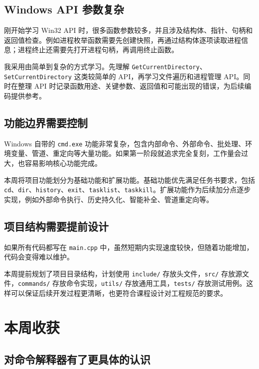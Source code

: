 \documentclass[UTF8]{ctexart}
\begin{document}
\subsection{Windows API 参数复杂}

刚开始学习 Win32 API 时，很多函数参数较多，并且涉及结构体、指针、句柄和返回值检查。例如进程枚举函数需要先创建快照，再通过结构体逐项读取进程信息；进程终止还需要先打开进程句柄，再调用终止函数。

我采用由简单到复杂的方式学习。先理解 \texttt{GetCurrentDirectory}、\texttt{SetCurrentDirectory} 这类较简单的 API，再学习文件遍历和进程管理 API。同时在整理 API 时记录函数用途、关键参数、返回值和可能出现的错误，为后续编码提供参考。

\subsection{功能边界需要控制}

Windows 自带的 \texttt{cmd.exe} 功能非常复杂，包含内部命令、外部命令、批处理、环境变量、管道、重定向等大量功能。如果第一阶段就追求完全复刻，工作量会过大，也容易影响核心功能完成。

本周将项目功能划分为基础功能和扩展功能。基础功能优先满足任务书要求，包括 \texttt{cd}、\texttt{dir}、\texttt{history}、\texttt{exit}、\texttt{tasklist}、\texttt{taskkill}。扩展功能作为后续加分点逐步实现，例如外部命令执行、历史持久化、智能补全、管道重定向等。

\subsection{项目结构需要提前设计}

如果所有代码都写在 \texttt{main.cpp} 中，虽然短期内实现速度较快，但随着功能增加，代码会变得难以维护。

本周提前规划了项目目录结构，计划使用 \texttt{include/} 存放头文件，\texttt{src/} 存放源文件，\texttt{commands/} 存放命令实现，\texttt{utils/} 存放通用工具，\texttt{tests/} 存放测试用例。这样可以保证后续开发过程更清晰，也更符合课程设计对工程规范的要求。

\section{本周收获}

\subsection{对命令解释器有了更具体的认识}
\end{document}
